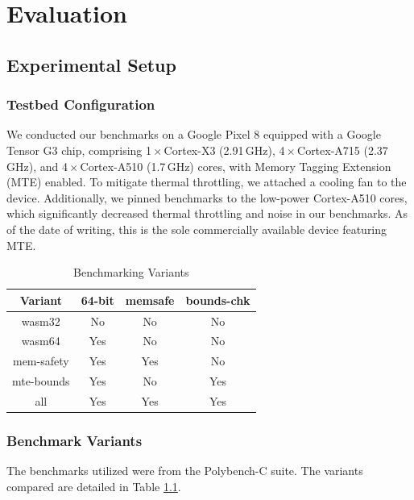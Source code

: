 \chapter{Evaluation}
\label{ch:eval}


\section{Experimental Setup}\label{sec:experimental-setup}

\subsection{Testbed Configuration}\label{subsec:testbed-configuration}
We conducted our benchmarks on a Google Pixel 8 equipped with a Google Tensor G3 chip, comprising 1\,$\times$\,Cortex-X3 (2.91\,GHz), 4\,$\times$\,Cortex-A715 (2.37\,GHz), and 4\,$\times$\,Cortex-A510 (1.7\,GHz) cores, with Memory Tagging Extension (MTE) enabled.
To mitigate thermal throttling, we attached a cooling fan to the device.
Additionally, we pinned benchmarks to the low-power Cortex-A510 cores, which significantly decreased thermal throttling and noise in our benchmarks. 
As of the date of writing, this is the sole commercially available device featuring MTE.

\begin{table}[ht]
    \centering
    \small
    \begin{tabular}{c || c c c}
        \hline
        \textbf{Variant} & \textbf{64-bit} & \textbf{memsafe} & \textbf{bounds-chk} \\
        \hline
        wasm32           & No              & No               & No                  \\
        wasm64           & Yes             & No               & No                  \\
        mem-safety       & Yes             & Yes              & No                  \\
        mte-bounds       & Yes             & No               & Yes                 \\
        all              & Yes             & Yes              & Yes                 \\
        \hline
    \end{tabular}
    \caption{Benchmarking Variants}
    \label{tab:benchmark-variants}
\end{table}

\subsection{Benchmark Variants}\label{subsec:benchmark-variants}
The benchmarks utilized were from the Polybench-C suite.
The variants compared are detailed in Table \ref{tab:benchmark-variants}.

